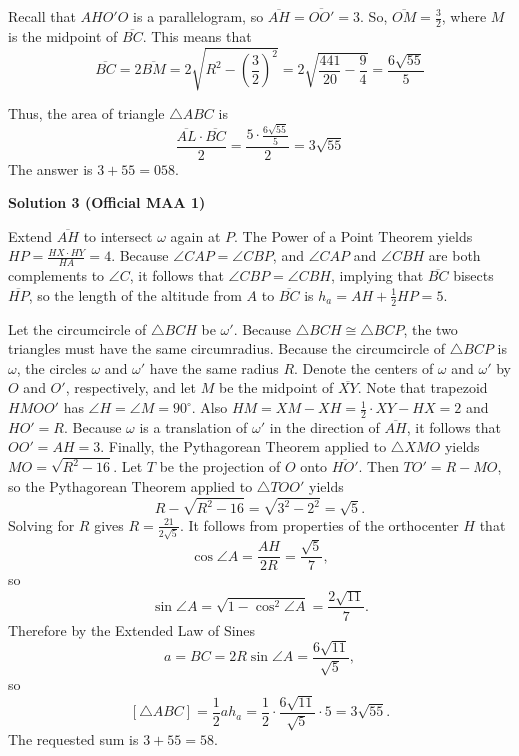 \begin{enumerate}
 Recall that $AHO'O$ is a parallelogram, so $\overline{AH} = \overline{OO'} = 3$.  So, $\overline{OM} = \frac32$, where $M$ is the midpoint of $\overline{BC}$.  This means that
 \[\overline{BC} = 2\overline{BM} = 2\sqrt{R^2 - \left(\frac32\right)^2} = 2\sqrt{\frac{441}{20} - \frac{9}{4}} = \frac{6\sqrt{55}}{5}\]

 Thus, the area of triangle $\triangle ABC$ is
 \[\frac{\overline{AL} \cdot \overline{BC}}{2} = \frac{5 \cdot \frac{6\sqrt{55}}{5}}{2} = {3\sqrt{55}}\]The answer is $3 + 55 = \boxed{058}$.

 



\textbf{Solution 3 (Official MAA 1)}

Extend $\overline{AH}$ to intersect $\omega$ again at $P$. The Power of a Point Theorem yields $HP = \frac{HX \cdot HY}{HA} = 4$. Because $\angle CAP=\angle CBP$, and $\angle CAP$ and $\angle CBH$ are both complements to $\angle C$, it follows that $\angle CBP = \angle CBH$, implying that $\overline{BC}$ bisects $\overline{HP}$, so the length of the altitude from $A$ to $\overline{BC}$ is $h_a = AH + \frac12 HP = 5$.

 Let the circumcircle of $\triangle BCH$ be $\omega'$. Because $\triangle BCH \cong \triangle BCP$, the two triangles must have the same circumradius. Because the circumcircle of $\triangle BCP$ is $\omega$, the circles $\omega$ and $\omega'$ have the same radius $R$. Denote the centers of $\omega$ and $\omega'$ by $O$ and $O'$, respectively, and let $M$ be the midpoint of $\overline{XY}$. Note that trapezoid $HMOO'$ has $\angle H = \angle M = 90^\circ$. Also $HM = XM - XH = \frac12\cdot XY - HX = 2$ and $HO' = R$. Because $\omega$ is a translation of $\omega'$ in the direction of $\overline{AH}$, it follows that $OO' = AH = 3$. Finally, the Pythagorean Theorem applied to $\triangle XMO$ yields $MO = \sqrt{R^2-16}$. Let $T$ be the projection of $O$ onto $\overline{HO'}$. Then $TO' = R-MO$, so the Pythagorean Theorem applied to $\triangle TOO'$ yields
 \[R - \sqrt{R^2-16} = \sqrt{3^2 - 2^2} = \sqrt{5}.\]Solving for $R$ gives $R = \frac{21}{2\sqrt5}$. It follows from properties of the orthocenter $H$ that
 \[\cos\angle A = \dfrac{AH}{2R} = \dfrac{\sqrt5}{7},\]so
 \[\sin\angle A = \sqrt{1 - \cos^2\angle A} = \dfrac{2\sqrt{11}}{7}.\]Therefore by the Extended Law of Sines
 \[a = BC = 2R \sin\angle A = \dfrac{6\sqrt{11}}{\sqrt5},\]so
 \[[\triangle ABC] = \frac12 a h_a = \frac12 \cdot \frac{6\sqrt{11}}{\sqrt{5}} \cdot 5 = 3\sqrt{55}.\]The requested sum is $3+55 = 58$.


\end{enumerate}
